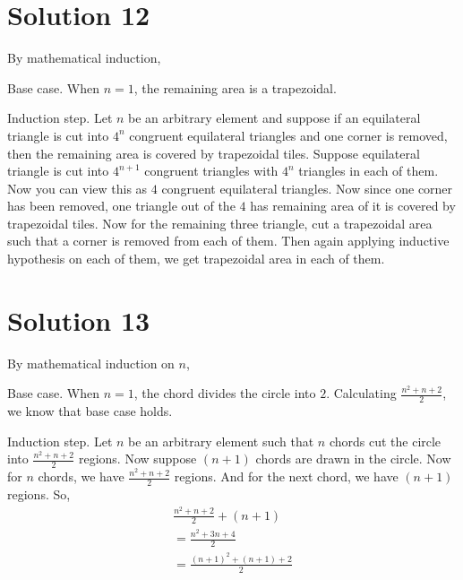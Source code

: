 \documentclass{article}
\begin{document}
\section{Solution 12}
By mathematical induction,

Base case. When $n=1$, the remaining area is a trapezoidal.

Induction step. Let $n$ be an arbitrary element and suppose if an
equilateral triangle is cut into $4^n$ congruent equilateral triangles
and one corner is removed, then the remaining area is covered by
trapezoidal tiles. Suppose equilateral triangle is cut into $4^{n+1}$
congruent triangles with $4^n$ triangles in each of them. Now you can
view this as $4$ congruent equilateral triangles. Now since one corner
has been removed, one triangle out of the $4$ has remaining area of it
is covered by trapezoidal tiles. Now for the remaining three triangle,
cut a trapezoidal area such that a corner is removed from each of
them. Then again applying inductive hypothesis on each of them, we get
trapezoidal area in each of them.

\section{Solution 13}
By mathematical induction on $n$,

Base case. When $n = 1$, the chord divides the circle into $2$.
Calculating $\frac{n^2 + n + 2}{2}$, we know that base case holds.

Induction step. Let $n$ be an arbitrary element such that $n$ chords
cut the circle into $\frac{n^2 + n + 2}{2}$ regions. Now suppose
$(n+1)$ chords are drawn in the circle. Now for $n$ chords, we have
$\frac{n^2 + n + 2}{2}$ regions. And for the next chord, we have
$(n+1)$ regions.
So,
\begin{align*}
  \frac{n^2 + n + 2}{2} + (n+1) \\
  = \frac{n^2 + 3n + 4}{2} \\
  = \frac{(n+1)^2 + (n+1) + 2}{2}
\end{align*}
\end{document}
